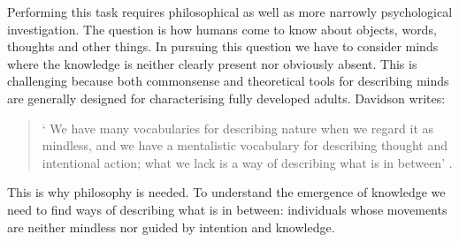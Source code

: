 \documentclass[12pt,\papersize]{extarticle}
\begin{document}
Performing this task  requires philosophical as well as more narrowly psychological investigation. 
The question is how humans come to know about objects, words, thoughts and other things. 
In pursuing this question we have to consider minds where the knowledge is neither clearly present nor obviously absent. 
This is challenging because both commonsense and theoretical tools for describing minds are generally designed for characterising fully developed adults. 
Davidson writes:
%
\begin{quote}
`%
We have many vocabularies for describing nature when we regard it as mindless, and we have a mentalistic vocabulary for describing thought and intentional action; what we lack is a way of describing what is in between' \citep[p.\ 11]{Davidson:1999ju}.
\end{quote}
%
%
This is why philosophy is needed. 
To understand the emergence of knowledge we need to find ways of describing what is in between: individuals whose movements are neither mindless nor guided by intention and knowledge.  
\end{document}
